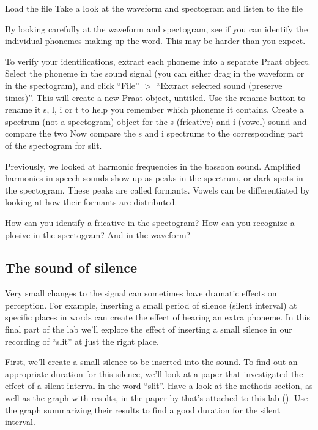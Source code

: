 \documentclass[a4paper, 9pt]{article}
\begin{document}
\begin{exercise}
\action Load the file 
\action Take a look at the waveform and spectogram and listen to the file
\end{exercise}

By looking carefully at the waveform and spectogram, see if you can
identify the individual phonemes making up the word. This may be harder
than you expect.

\begin{exercise}
\action To verify your identifications, extract each phoneme into a separate Praat object. Select the phoneme in the sound signal (you can either drag in the waveform or in the spectogram), and click ``File'' $>$ ``Extract selected sound (preserve times)''. This will create a new Praat object, untitled. Use the rename button to rename it s, l, i or t to help you remember which phoneme it contains. 
\action Create a spectrum (not a spectogram) object for the s (fricative) and i (vowel) sound and compare the two
\action Now compare the s and i spectrums to the corresponding part of the spectogram for slit. 
\end{exercise}

Previously, we looked at harmonic frequencies in the bassoon sound.
Amplified harmonics in speech sounds show up as peaks in the spectrum,
or dark spots in the spectogram. These peaks are called formants. Vowels
can be differentiated by looking at how their formants are distributed.

\begin{exercise}
\ask How can you identify a fricative in the spectogram?
\askstar How can you recognize a plosive in the spectogram? And in the waveform?
\end{exercise}

\subsection{The sound of silence}\label{the-sound-of-silence}

Very small changes to the signal can sometimes have dramatic effects on
perception. For example, inserting a small period of silence (silent
interval) at specific places in words can create the effect of hearing
an extra phoneme. In this final part of the lab we'll explore the effect
of inserting a small silence in our recording of ``slit'' at just the
right place.

First, we'll create a small silence to be inserted into the
 sound. To find out an appropriate duration for this
silence, we'll look at a paper that investigated the effect of a silent
interval in the word ``slit''. Have a look at the methods section, as
well as the graph with results, in the paper by \cite{Marcus1978} that's
attached to this lab (). Use the graph summarizing their
results to find a good duration for the silent interval.
\end{document}
